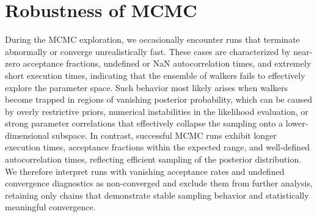 \section{Robustness of MCMC}
During the MCMC exploration, we occasionally encounter runs that terminate abnormally or converge unrealistically fast. These cases are characterized by near-zero acceptance fractions, undefined or NaN autocorrelation times, and extremely short execution times, indicating that the ensemble of walkers fails to effectively explore the parameter space. Such behavior most likely arises when walkers become trapped in regions of vanishing posterior probability, which can be caused by overly restrictive priors, numerical instabilities in the likelihood evaluation, or strong parameter correlations that effectively collapse the sampling onto a lower-dimensional subspace. In contrast, successful MCMC runs exhibit longer execution times, acceptance fractions within the expected range, and well-defined autocorrelation times, reflecting efficient sampling of the posterior distribution. We therefore interpret runs with vanishing acceptance rates and undefined convergence diagnostics as non-converged and exclude them from further analysis, retaining only chains that demonstrate stable sampling behavior and statistically meaningful convergence.